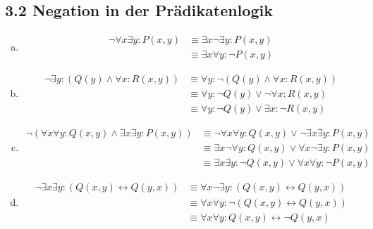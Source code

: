 \documentclass[12pt,a4paper]{article}
\begin{document}
\subsection*{3.2 Negation in der Prädikatenlogik}
\begin{enumerate}[a)]
\item \begin{align*}
\neg \forall x \exists y:P(x,y) &\equiv \exists x \neg\exists y:P(x,y)\\
&\equiv \exists x \forall y: \neg P(x,y)
\end{align*}
\item \begin{align*}
\neg \exists y: (Q(y) \land \forall x: R(x,y)) &\equiv \forall y: \neg (Q(y) \land \forall x: R(x,y))\\
&\equiv \forall y: \neg Q(y) \lor \neg \forall x: R(x,y)\\
&\equiv \forall y: \neg Q(y) \lor \exists x: \neg R(x,y)
\end{align*}
\item \begin{align*}
\neg (\forall x \forall y: Q(x,y) \land \exists x \exists y: P(x,y)) &\equiv \neg \forall x \forall y: Q(x,y) \lor \neg \exists x \exists y: P(x,y)\\
&\equiv \exists x \neg\forall y: Q(x,y) \lor \forall x\neg\exists y: P(x,y)\\
&\equiv \exists x\exists y: \neg Q(x,y) \lor \forall x \forall y: \neg P(x,y)
\end{align*}
\item
\begin{align*}
\neg \exists x \exists y: (Q(x,y) \leftrightarrow Q(y,x)) &\equiv \forall x \neg \exists y: (Q(x,y) \leftrightarrow Q(y,x))\\
&\equiv \forall x \forall y : \neg(Q(x,y) \leftrightarrow Q(y,x))\\
&\equiv \forall x \forall y: Q(x,y) \leftrightarrow \neg Q(y,x)
\end{align*}
\end{enumerate}
\end{document}
